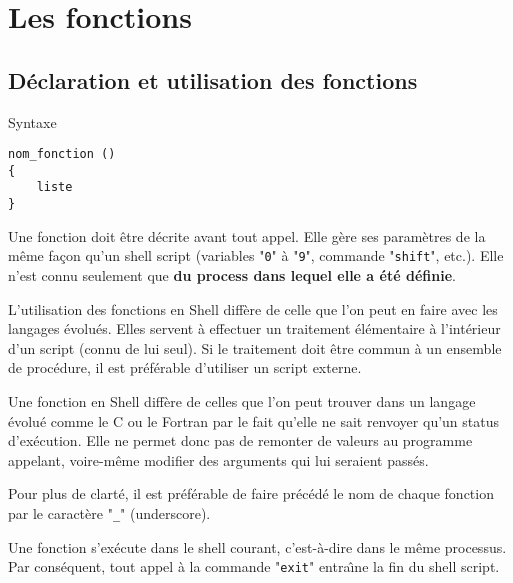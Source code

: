 \section{\label{sh-functions}Les fonctions}

\subsection{D{\'e}claration et utilisation des fonctions}

\begin{definition}{Syntaxe}
\begin{verbatim}
nom_fonction ()
{
    liste
}
\end{verbatim}
\end{definition}

Une fonction doit {\^e}tre d{\'e}crite avant tout appel. Elle g{\`e}re ses param{\`e}tres de la m{\^e}me fa\c{c}on qu'un 
shell script (variables "\texttt{0}" {\`a} "\texttt{9}", commande "\texttt{shift}", etc.).
Elle n{'}est connu seulement que {\bf du process dans lequel elle a {\'e}t{\'e} d{\'e}finie}.

L{'}utilisation des fonctions en Shell diff{\`e}re de celle que l{'}on peut en faire avec les langages {\'e}volu{\'e}s. 
Elles servent {\`a} effectuer un traitement {\'e}l{\'e}mentaire {\`a} l{'}int{\'e}rieur d{'}un script (connu de lui seul). Si le 
traitement doit {\^e}tre commun {\`a} un ensemble de proc{\'e}dure, il est pr{\'e}f{\'e}rable d{'}utiliser un script 
externe.

Une fonction en Shell diff{\`e}re de celles que l'on peut trouver dans un langage {\'e}volu{\'e} comme
le C ou le Fortran par le fait qu'elle ne sait renvoyer qu'un status d'ex{\'e}cution. Elle
ne permet donc  pas de remonter de valeurs au programme appelant, voire-m{\^e}me
modifier des arguments qui lui seraient pass{\'e}s.

\begin{remarque}
Pour plus de clart{\'e}, il est pr{\'e}f{\'e}rable de faire pr{\'e}c{\'e}d{\'e} le nom de chaque fonction par le 
caract{\`e}re "\texttt{\_}" (underscore).
\end{remarque}

Une fonction s'ex{\'e}cute dans le shell courant,  c{'}est-{\`a}-dire dans le m{\^e}me processus. Par 
cons{\'e}quent, tout appel {\`a} la commande "\texttt{exit}" entra{\^\i}ne la fin du shell script.


